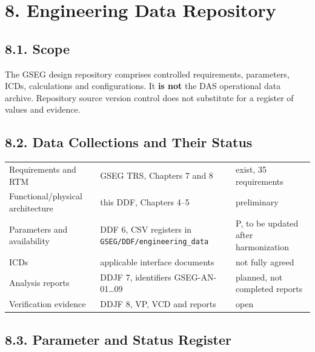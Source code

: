 \section{8. Engineering Data Repository}\label{engineering-data-repository}

\subsection{8.1. Scope}\label{identification-and-scope}

The GSEG design repository comprises controlled requirements, parameters, ICDs, calculations and configurations. It \textbf{is not} the DAS operational data archive. Repository source version control does not substitute for a register of values and evidence.

\subsection{8.2. Data Collections and Their Status}\label{engineering-data-collections}

\begingroup{}
\begin{longtable}{|P{0.27}|P{0.38}|P{0.35}|}
\hline{}
 &  & \\ \hline
\endhead
\hline\endlastfoot
Requirements and RTM & GSEG TRS, Chapters 7 and 8 & exist, 35 requirements\\ \hline
Functional/\allowbreak{}physical architecture & this DDF, Chapters 4–5 & preliminary\\ \hline
Parameters and availability & DDF 6, CSV registers in \texttt{GSEG/\allowbreak{}DDF/\allowbreak{}engineering\_\allowbreak{}data} & P, to be updated after harmonization\\ \hline
ICDs & applicable interface documents & not fully agreed\\ \hline
Analysis reports & DDJF 7, identifiers GSEG-AN-01…09 & planned, not completed reports\\ \hline
Verification evidence & DDJF 8, VP, VCD and reports & open\\*
\end{longtable}
\endgroup

\subsection{8.3. Parameter and Status Register}\label{parameter-identification-and-status}

